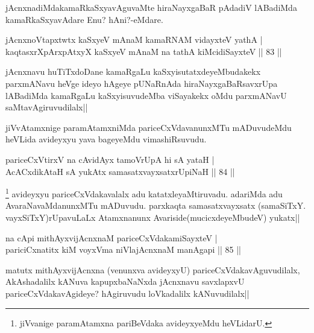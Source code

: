 \begin{artha}
jAcnxnadiMdakamaRkaSxyavAguvaMte hiraNayxgaBaR pAdadiV lABadiMda kamaRkaSxyavAdare Enu? hAni?-eMdare.
\end{artha}


\begin{shl}
jAcnxnoVtapxtwtx kaSxyeV mAnaM kamaRNAM vidayxteV yathA |\\
kaqtasxrXpArxpAtxyX kaSxyeV mAnaM na tathA kiMcidiSayxteV \hfill || 83 ||
\end{shl}

\begin{artha}
jAcnxnavu huTiTxdoDane kamaRgaLu kaSxyisutatxdeyeMbudakekx parxmANavu heVge ideyo hAgeye pUNaRnAda hiraNayxgaBaRsavxrUpa lABadiMda kamaRgaLu kaSxyisuvudeMba viSayakekx oMdu parxmANavU saMtavAgiruvudilalx||
\end{artha}

\begin{artha}
jiVvAtamxnige paramAtamxniMda pariceCxVdavanunxMTu mADuvudeMdu heVLida avideyxyu yava bageyeMdu vimashiRsuvudu.
\end{artha}


\begin{shl}
pariceCxVtirxV na cAvidAyx tamoVrUpA hi sA yataH |\\
AcACxdikA\s taH sA yukAtx samasatxvayxsatxrUpiNaH \hfill || 84 ||
\end{shl}


\begin{artha}
\footnote{jiVvanige paramAtamxna pariBeVdaka avideyxyeMdu heVLidarU.} avideyxyu pariceCxVdakavalalx adu katatxleyaMtiruvadu. adariMda adu AvaraNavaMdanunxMTu mADuvudu. parxkaqta samasatxvayxsatx (samaSiTxY. vayxSiTxY)rUpavuLaLx Atamxnanunx Avariside(mucicxdeyeMbudeV) yukatx||
\end{artha}

\begin{shl}
na cApi mithAyxvijAcnxnaM pariceCxVdakamiSayxteV |\\
pariciCxnatitx kiM voyxVma niVlajAcnxnaM manAgapi \hfill || 85 ||
\end{shl}

\begin{artha}
matutx mithAyxvijAcnxna (venunxva avideyxyU) pariceCxVdakavAguvudilalx, AkAshadalilx 
kANuva kapupxbaNaNxda jAcnxnavu savxlapxvU pariceCxVdakavAgideye? hAgiruvudu loVkadalilx 
kANuvudilalx||
\end{artha}

